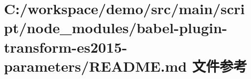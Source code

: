\hypertarget{node__modules_2babel-plugin-transform-es2015-parameters_2_r_e_a_d_m_e_8md}{}\section{C\+:/workspace/demo/src/main/script/node\+\_\+modules/babel-\/plugin-\/transform-\/es2015-\/parameters/\+R\+E\+A\+D\+ME.md 文件参考}
\label{node__modules_2babel-plugin-transform-es2015-parameters_2_r_e_a_d_m_e_8md}
